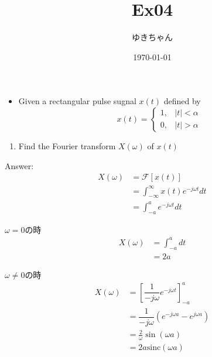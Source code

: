 \documentclass[a4paper,16pt]{jsarticle}
\title{Ex04}
\author{ゆきちゃん}
\date{\today}
\begin{document}
\maketitle

\begin{itemize}
	\item Given a rectangular pulse sugnal $x(t)$ defined by
	\begin{equation}
		x(t) =
		\begin{cases}
			1, & |t| < \alpha \\
			0, & |t| > \alpha
		\end{cases}
	\end{equation}
\end{itemize}

\begin{enumerate}
	\item Find the Fourier transform $X(\omega)$ of $x(t)$
\end{enumerate}

Answer:
\begin{align}
	X(\omega) &= \mathcal{F}[x(t)] \\
	&= \int_{-\infty}^\infty x(t) e^{-j\omega t}dt \\
	&= \int_{-a}^a e^{-j\omega t}dt
\end{align}

$\omega = 0$の時
\begin{align}
	X(\omega) &= \int_{-a}^a dt \\
	&= 2a
\end{align}

$\omega \neq 0$の時
\begin{align}
	X(\omega) &= \left[\dfrac{1}{-j\omega} e^{-j\omega t}\right]_{-a}^a\\
	&= \dfrac{1}{-j\omega}\left(e^{-j\omega a} - e^{j\omega a}\right) \\
	&= \frac{2}{\omega} \sin(\omega a) \\
	&= 2a \mathrm{sinc}(\omega a)
\end{align}
\end{document}
